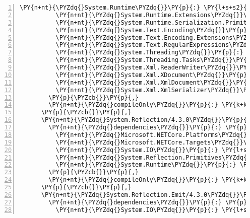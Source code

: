 \begin{Verbatim}[commandchars=\\\{\},numbers=left,firstnumber=1,stepnumber=1,numberblanklines=0]
          \PY{n+nt}{\PYZdq{}System.Runtime\PYZdq{}}\PY{p}{:} \PY{l+s+s2}{\PYZdq{}4.3.0\PYZdq{}}\PY{p}{,}
          \PY{n+nt}{\PYZdq{}System.Runtime.Extensions\PYZdq{}}\PY{p}{:} \PY{l+s+s2}{\PYZdq{}4.3.0\PYZdq{}}\PY{p}{,}
          \PY{n+nt}{\PYZdq{}System.Runtime.Serialization.Primitives\PYZdq{}}\PY{p}{:} \PY{l+s+s2}{\PYZdq{}4.3.0\PYZdq{}}\PY{p}{,}
          \PY{n+nt}{\PYZdq{}System.Text.Encoding\PYZdq{}}\PY{p}{:} \PY{l+s+s2}{\PYZdq{}4.3.0\PYZdq{}}\PY{p}{,}
          \PY{n+nt}{\PYZdq{}System.Text.Encoding.Extensions\PYZdq{}}\PY{p}{:} \PY{l+s+s2}{\PYZdq{}4.3.0\PYZdq{}}\PY{p}{,}
          \PY{n+nt}{\PYZdq{}System.Text.RegularExpressions\PYZdq{}}\PY{p}{:} \PY{l+s+s2}{\PYZdq{}4.3.0\PYZdq{}}\PY{p}{,}
          \PY{n+nt}{\PYZdq{}System.Threading\PYZdq{}}\PY{p}{:} \PY{l+s+s2}{\PYZdq{}4.3.0\PYZdq{}}\PY{p}{,}
          \PY{n+nt}{\PYZdq{}System.Threading.Tasks\PYZdq{}}\PY{p}{:} \PY{l+s+s2}{\PYZdq{}4.3.0\PYZdq{}}\PY{p}{,}
          \PY{n+nt}{\PYZdq{}System.Xml.ReaderWriter\PYZdq{}}\PY{p}{:} \PY{l+s+s2}{\PYZdq{}4.3.0\PYZdq{}}\PY{p}{,}
          \PY{n+nt}{\PYZdq{}System.Xml.XDocument\PYZdq{}}\PY{p}{:} \PY{l+s+s2}{\PYZdq{}4.3.0\PYZdq{}}\PY{p}{,}
          \PY{n+nt}{\PYZdq{}System.Xml.XmlDocument\PYZdq{}}\PY{p}{:} \PY{l+s+s2}{\PYZdq{}4.3.0\PYZdq{}}\PY{p}{,}
          \PY{n+nt}{\PYZdq{}System.Xml.XmlSerializer\PYZdq{}}\PY{p}{:} \PY{l+s+s2}{\PYZdq{}4.3.0\PYZdq{}}
        \PY{p}{\PYZcb{}}\PY{p}{,}
        \PY{n+nt}{\PYZdq{}compileOnly\PYZdq{}}\PY{p}{:} \PY{k+kc}{true}
      \PY{p}{\PYZcb{}}\PY{p}{,}
      \PY{n+nt}{\PYZdq{}System.Reflection/4.3.0\PYZdq{}}\PY{p}{:} \PY{p}{\PYZob{}}
        \PY{n+nt}{\PYZdq{}dependencies\PYZdq{}}\PY{p}{:} \PY{p}{\PYZob{}}
          \PY{n+nt}{\PYZdq{}Microsoft.NETCore.Platforms\PYZdq{}}\PY{p}{:} \PY{l+s+s2}{\PYZdq{}2.1.0\PYZhy{}rc1\PYZdq{}}\PY{p}{,}
          \PY{n+nt}{\PYZdq{}Microsoft.NETCore.Targets\PYZdq{}}\PY{p}{:} \PY{l+s+s2}{\PYZdq{}2.1.0\PYZhy{}rc1\PYZdq{}}\PY{p}{,}
          \PY{n+nt}{\PYZdq{}System.IO\PYZdq{}}\PY{p}{:} \PY{l+s+s2}{\PYZdq{}4.3.0\PYZdq{}}\PY{p}{,}
          \PY{n+nt}{\PYZdq{}System.Reflection.Primitives\PYZdq{}}\PY{p}{:} \PY{l+s+s2}{\PYZdq{}4.3.0\PYZdq{}}\PY{p}{,}
          \PY{n+nt}{\PYZdq{}System.Runtime\PYZdq{}}\PY{p}{:} \PY{l+s+s2}{\PYZdq{}4.3.0\PYZdq{}}
        \PY{p}{\PYZcb{}}\PY{p}{,}
        \PY{n+nt}{\PYZdq{}compileOnly\PYZdq{}}\PY{p}{:} \PY{k+kc}{true}
      \PY{p}{\PYZcb{}}\PY{p}{,}
      \PY{n+nt}{\PYZdq{}System.Reflection.Emit/4.3.0\PYZdq{}}\PY{p}{:} \PY{p}{\PYZob{}}
        \PY{n+nt}{\PYZdq{}dependencies\PYZdq{}}\PY{p}{:} \PY{p}{\PYZob{}}
          \PY{n+nt}{\PYZdq{}System.IO\PYZdq{}}\PY{p}{:} \PY{l+s+s2}{\PYZdq{}4.3.0\PYZdq{}}\PY{p}{,}

\end{Verbatim}
